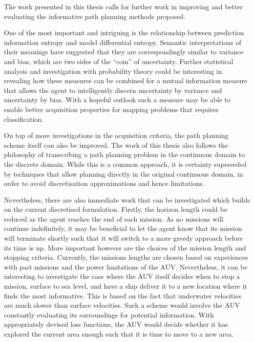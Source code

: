 	The work presented in this thesis calls for further work in improving and better evaluating the informative path planning methods proposed.
	
	One of the most important and intriguing is the relationship between prediction information entropy and model differential entropy. Semantic interpretations of their meanings have suggested that they are correspondingly similar to variance and bias, which are two sides of the ``coin'' of uncertainty. Further statistical analysis and investigation with probability theory could be interesting in revealing how these measures can be combined for a mutual information measure that allows the agent to intelligently discern uncertainty by variance and uncertainty by bias. With a hopeful outlook such a measure may be able to enable better acquisition properties for mapping problems that requires classification.
	
	On top of more investigations in the acquisition criteria, the path planning scheme itself can also be improved. The work of this thesis also follows the philosophy of transcribing a path planning problem in the continuous domain to the discrete domain. While this is a common approach, it is certainty superseded by techniques that allow planning directly in the original continuous domain, in order to avoid discretisation approximations and hence limitations. 
	
	Nevertheless, there are also immediate work that can be investigated which builds on the current discretised formulation. Firstly, the horizon length could be reduced as the agent reaches the end of each mission. As no missions will continue indefinitely, it may be beneficial to let the agent know that its mission will terminate shortly such that it will switch to a more greedy approach before its time is up. More important however are the choices of the mission length and stopping criteria. Currently, the missions lengths are chosen based on experiences with past missions and the power limitations of the AUV. Nevertheless, it can be interesting to investigate the case where the AUV itself decides when to stop a mission, surface to sea level, and have a ship deliver it to a new location where it finds the most informative. This is based on the fact that underwater velocities are much slower than surface velocities. Such a scheme would involve the AUV constantly evaluating its surroundings for potential information. With appropriately devised loss functions, the AUV would decide whether it has explored the current area enough such that it is time to move to a new area.
		
